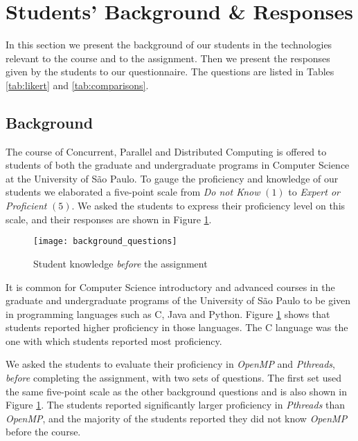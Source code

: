 \section{Students' Background \& Responses}
\label{sec:responses}

In this section we present the background of our students in the technologies
relevant to the course and to the assignment. Then we present the responses
given by the students to our questionnaire. The questions are listed in Tables
\ref{tab:likert} and \ref{tab:comparisons}.


\subsection{Background}

The course of Concurrent, Parallel and Distributed Computing is offered to
students of both the graduate and undergraduate programs in Computer Science at
the University of São Paulo. To gauge the proficiency and knowledge of our
students we elaborated a five-point scale from \textit{Do not Know} $(1)$ to
\textit{Expert or Proficient} $(5)$.  We asked the students to express their
proficiency level on this scale, and their responses are shown in Figure
\ref{fig:background}.

\begin{figure}[htpb]
    \centering
    \texttt{[image: background\_questions]}
    \caption{Student knowledge \textit{before} the assignment}
    \label{fig:background}
\end{figure}

It is common for Computer Science introductory and advanced courses in the
graduate and undergraduate programs of the University of São Paulo to be given
in programming languages such as C, Java and Python. Figure
\ref{fig:background} shows that students reported higher proficiency in those
languages. The C language was the one with which students reported most
proficiency.

We asked the students to evaluate their proficiency in \textit{OpenMP} and
\textit{Pthreads}, \textit{before} completing the assignment, with two sets of
questions. The first set used the same five-point scale as the other background
questions and is also shown in Figure \ref{fig:background}. The students
reported significantly larger proficiency in \textit{Pthreads} than
\textit{OpenMP}, and the majority of the students reported they did not know
\textit{OpenMP} before the course.


